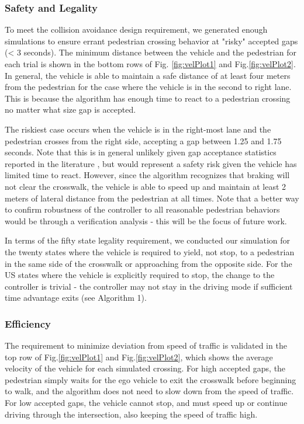 \documentclass[letterpaper, 10 pt, conference]{ieeeconf}  %
\begin{document}
\subsubsection{Safety and Legality}

To meet the collision avoidance design requirement, we generated enough simulations to ensure errant pedestrian crossing behavior at "risky" accepted gaps (< 3 seconds). The minimum distance between the vehicle and the pedestrian for each trial is shown in the bottom rows of Fig. \ref{fig:velPlot1} and Fig.\ref{fig:velPlot2}. In general, the vehicle is able to maintain a safe distance of at least four meters from the pedestrian for the case where the vehicle is in the second to right lane. This is because the algorithm has enough time to react to a pedestrian crossing no matter what size gap is accepted. 

The riskiest case occurs when the vehicle is in the right-most lane and the pedestrian crosses from the right side, accepting a gap between 1.25 and 1.75 seconds. Note that this is in general unlikely given gap acceptance statistics reported in the literature \cite{Feliciani2017}\cite{Rasouli}, but would represent a safety risk given the vehicle has limited time to react. However, since the algorithm recognizes that braking will not clear the crosswalk, the vehicle is able to speed up and maintain at least 2 meters of lateral distance from the pedestrian at all times. Note that a better way to confirm robustness of the controller to all reasonable pedestrian behaviors would be through a verification analysis - this will be the focus of future work. 

In terms of the fifty state legality requirement, we conducted our simulation for the twenty states where the vehicle is required to yield, not stop, to a pedestrian in the same side of the crosswalk or approaching from the opposite side. For the US states where the vehicle is explicitly required to stop, the change to the controller is trivial - the controller may not stay in the driving mode if sufficient time advantage exits (see Algorithm 1). 

\subsubsection{Efficiency}

The requirement to minimize deviation from speed of traffic is validated in the top row of Fig.\ref{fig:velPlot1} and Fig.\ref{fig:velPlot2}, which shows the average velocity of the vehicle for each simulated crossing. For high accepted gaps, the pedestrian simply waits for the ego vehicle to exit the crosswalk before beginning to walk, and the algorithm does not need to slow down from the speed of traffic. For low accepted gaps, the vehicle cannot stop, and must speed up or continue driving through the intersection, also keeping the speed of traffic high.  
\end{document}
